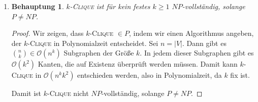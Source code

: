 \documentclass[a4paper]{scrartcl}
\newtheorem*{proposition}{Behauptung}
\newcommand{\Oh}{\mathcal{O}}
\begin{document}
\begin{enumerate}[label=\bfseries \arabic*]
\begin{enumerate}
\begin{proof}
\begin{enumerate}
\begin{itemize}
                    \item $\Leftarrow$: \\
                        Sei $\overline{T'}$ ein \textsc{4D-Matching} für das
                        konstruierte Problem $\langle W,X,Y,Z,\overline{T}
                        \rangle$.
                        \begin{equation*}
                            T' = \left\{ (x,y,z)\ |\ (w,x,y,z) \in \overline{T'} \right\}
                        \end{equation*}
                        ist dann offensichtlich ein \textsc{3D-Matching} für
                        das ursprüngliche Problem. (Die geforderte Eigenschaft
                        bleibt für die restlichen drei Mengen bestehen, wenn
                        die erste Komponente weggelassen wird.)
                \end{itemize}
                Es gilt also \textsc{3D-Matching} $\leq_p$
                \textsc{4D-Matching}, letzteres ist also mindestens so schwer
                wie ersteres. Da wir von \textsc{3D-Matching} wissen, dass es
                $NP$-vollständig ist, folgt, dass \textsc{4D-Matching}
                $NP$-schwierig ist.

        \end{enumerate}
        Aus i. und ii. folgt, dass \textsc{4D-Matching} $NP$-vollständig ist.
    \end{proof}

    \item
        \begin{proposition}
            \textsc{$k$-Clique} ist für kein festes $k \geq 1$
            $NP$-vollständig, solange $P \neq NP$.
        \end{proposition}
        \begin{proof}
            Wir zeigen, dass \textsc{$k$-Clique} $\in P$, indem wir einen
            Algorithmus angeben, der \textsc{$k$-Clique} in Polynomialzeit
            entscheidet.
            Sei $n = |V|$.
            Dann gibt es $\binom{n}{k} \in \Oh(n^k)$ Subgraphen der Größe $k$.
            In jedem dieser Subgraphen gibt es $\Oh(k^2)$ Kanten, die auf
            Existenz überprüft werden müssen.
            Damit kann \textsc{$k$-Clique} in $\Oh(n^kk^2)$ entschieden werden,
            also in Polynomialzeit, da $k$ fix ist.

            Damit ist \textsc{$k$-Clique} nicht $NP$-vollständig, solange $P \neq NP$.
        \end{proof}


\end{enumerate}
\end{enumerate}
\end{document}
